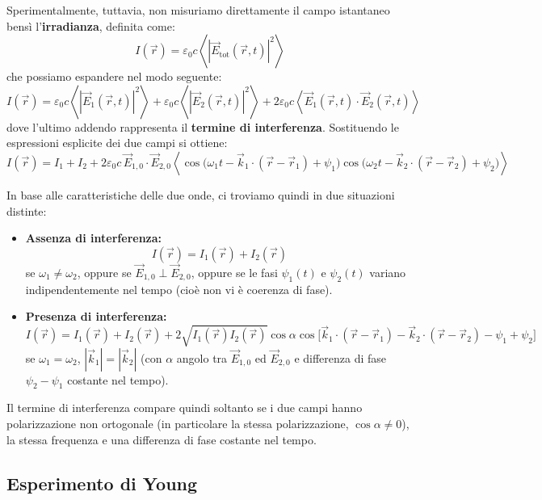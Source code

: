 \documentclass[openany,a4paper,12pt]{book}
\begin{document}
Sperimentalmente, tuttavia, non misuriamo direttamente il campo istantaneo bensì l'\textbf{irradianza}, definita come:
\[
    I(\vec{r}) = \varepsilon_0 c \left\langle \left|\vec{E}_{\text{tot}}(\vec{r}, t)\right|^2 \right\rangle
\]
che possiamo espandere nel modo seguente:
\begin{equation}
    I(\vec{r}) = \varepsilon_0 c \left\langle |\vec{E}_1(\vec{r}, t)|^2 \right\rangle + \varepsilon_0 c \left\langle |\vec{E}_2(\vec{r}, t)|^2 \right\rangle + 2 \varepsilon_0 c \left\langle \vec{E}_1(\vec{r}, t) \cdot \vec{E}_2(\vec{r}, t) \right\rangle
\end{equation}
dove l'ultimo addendo rappresenta il \textbf{termine di interferenza}. Sostituendo le espressioni esplicite dei due campi si ottiene:
\[
    I(\vec{r}) = I_1 + I_2 + 2 \varepsilon_0 c \, \vec{E}_{1,0} \cdot \vec{E}_{2,0} \left\langle \cos\bigl(\omega_1 t - \vec{k}_1 \cdot (\vec{r} - \vec{r}_1) + \psi_1\bigr) \cos\bigl(\omega_2 t - \vec{k}_2 \cdot (\vec{r} - \vec{r}_2) + \psi_2\bigr) \right\rangle
\]

In base alle caratteristiche delle due onde, ci troviamo quindi in due situazioni distinte:
\begin{itemize}
    \item \textbf{Assenza di interferenza:}
    \[
        I(\vec{r}) = I_1(\vec{r}) + I_2(\vec{r})
    \]
    se $\omega_1 \neq \omega_2$, oppure se $\vec{E}_{1,0} \perp \vec{E}_{2,0}$, oppure se le fasi $\psi_1(t)$ e $\psi_2(t)$ variano indipendentemente nel tempo (cioè non vi è coerenza di fase).

    \item \textbf{Presenza di interferenza:}
    \[
        I(\vec{r}) = I_1(\vec{r}) + I_2(\vec{r}) + 2\sqrt{I_1(\vec{r}) I_2(\vec{r})} \cos\alpha \cos\bigl[\vec{k}_1 \cdot (\vec{r} - \vec{r}_1) - \vec{k}_2 \cdot (\vec{r} - \vec{r}_2) - \psi_1 + \psi_2\bigr]
    \]
    se $\omega_1 = \omega_2$, $|\vec{k}_1| = |\vec{k}_2|$ (con $\alpha$ angolo tra $\vec{E}_{1,0}$ ed $\vec{E}_{2,0}$ e differenza di fase $\psi_2 - \psi_1$ costante nel tempo).
\end{itemize}

Il termine di interferenza compare quindi soltanto se i due campi hanno polarizzazione non ortogonale (in particolare la stessa polarizzazione, $\cos\alpha \neq 0$), la stessa frequenza e una differenza di fase costante nel tempo.

\subsection*{Esperimento di Young}
\end{document}
